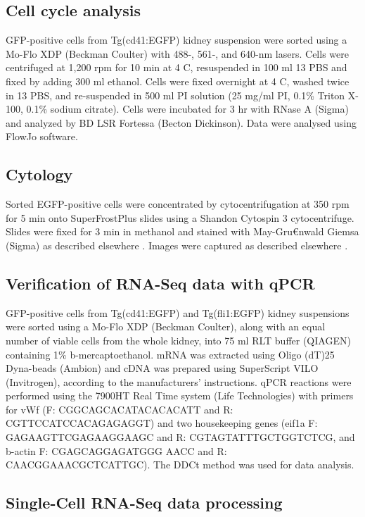 \subsection{Cell cycle analysis}

GFP-positive cells from Tg(cd41:EGFP) kidney suspension were sorted using a Mo-Flo XDP (Beckman Coulter) with 488-, 561-, and 640-nm lasers. Cells were centrifuged at 1,200 rpm for 10 min at 4 C, resuspended in 100 ml 13 PBS and fixed by adding 300 ml ethanol. Cells were fixed overnight at 4 C, washed twice in 13 PBS, and re-suspended in 500 ml PI solution (25 mg/ml PI, 0.1\% Triton X-100, 0.1\% sodium citrate). Cells were incubated for 3 hr with RNase A (Sigma) and analyzed by BD LSR Fortessa (Becton Dickinson). Data were analysed using FlowJo software.

\subsection{Cytology}

Sorted EGFP-positive cells were concentrated by cytocentrifugation at 350 rpm for 5 min onto SuperFrostPlus slides using a Shandon Cytospin 3 cytocentrifuge. Slides were fixed for 3 min in methanol and stained with May-Gru€nwald Giemsa (Sigma) as described elsewhere \cite{Stachura2009-gd}. Images were captured as described elsewhere \cite{Bielczyk-Maczynska2014-hf}.

\subsection{Verification of RNA-Seq data with qPCR}

GFP-positive cells from Tg(cd41:EGFP) and Tg(fli1:EGFP) kidney suspensions were sorted using a Mo-Flo XDP (Beckman Coulter), along with an equal number of viable cells from the whole kidney, into 75 ml RLT buffer (QIAGEN) containing 1\% b-mercaptoethanol. mRNA was extracted using Oligo (dT)25 Dyna-beads (Ambion) and cDNA was prepared using SuperScript VILO (Invitrogen), according to the manufacturers’ instructions. qPCR reactions were performed using the 7900HT Real Time system (Life Technologies) with primers for vWf (F: CGGCAGCACATACACACATT and R: CGTTCCATCCACAGAGAGGT) and two housekeeping genes (eif1a F: GAGAAGTTCGAGAAGGAAGC and R: CGTAGTATTTGCTGGTCTCG, and b-actin F: CGAGCAGGAGATGGG AACC and R: CAACGGAAACGCTCATTGC). The DDCt method was used for data analysis.

\subsection{Single-Cell RNA-Seq data processing}

